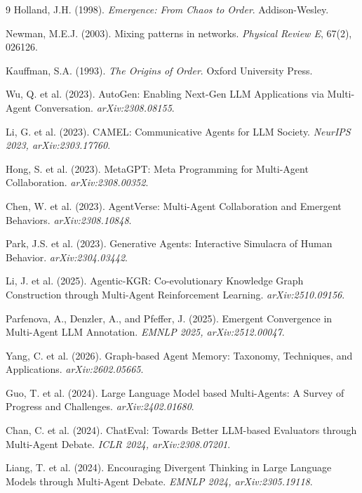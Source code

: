\documentclass[12pt]{article}
\begin{document}
\begin{thebibliography}{9}
  Holland, J.H. (1998). \textit{Emergence: From Chaos to Order}. Addison-Wesley.

  Newman, M.E.J. (2003). Mixing patterns in networks.
  \textit{Physical Review E}, 67(2), 026126.

  Kauffman, S.A. (1993). \textit{The Origins of Order}. Oxford University Press.

  Wu, Q. et al. (2023). AutoGen: Enabling Next-Gen LLM Applications via Multi-Agent
  Conversation. \textit{arXiv:2308.08155}.

  Li, G. et al. (2023). CAMEL: Communicative Agents for LLM Society.
  \textit{NeurIPS 2023, arXiv:2303.17760}.

  Hong, S. et al. (2023). MetaGPT: Meta Programming for Multi-Agent Collaboration.
  \textit{arXiv:2308.00352}.

  Chen, W. et al. (2023). AgentVerse: Multi-Agent Collaboration and Emergent Behaviors.
  \textit{arXiv:2308.10848}.

  Park, J.S. et al. (2023). Generative Agents: Interactive Simulacra of Human Behavior.
  \textit{arXiv:2304.03442}.

  Li, J. et al. (2025). Agentic-KGR: Co-evolutionary Knowledge Graph Construction
  through Multi-Agent Reinforcement Learning. \textit{arXiv:2510.09156}.

  Parfenova, A., Denzler, A., and Pfeffer, J. (2025).
  Emergent Convergence in Multi-Agent LLM Annotation.
  \textit{EMNLP 2025, arXiv:2512.00047}.

  Yang, C. et al. (2026). Graph-based Agent Memory: Taxonomy, Techniques, and
  Applications. \textit{arXiv:2602.05665}.

  Guo, T. et al. (2024). Large Language Model based Multi-Agents: A Survey of
  Progress and Challenges. \textit{arXiv:2402.01680}.

  Chan, C. et al. (2024). ChatEval: Towards Better LLM-based Evaluators through
  Multi-Agent Debate. \textit{ICLR 2024, arXiv:2308.07201}.

  Liang, T. et al. (2024). Encouraging Divergent Thinking in Large Language Models
  through Multi-Agent Debate. \textit{EMNLP 2024, arXiv:2305.19118}.


\end{thebibliography}
\end{document}
